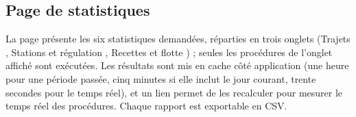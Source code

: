 \subsection{Page de statistiques}

La page présente les six statistiques demandées, réparties en trois onglets (\og Trajets \fg{}, \og Stations et régulation \fg{}, \og Recettes et flotte \fg{}) ; seules les procédures de l'onglet affiché sont exécutées. Les résultats sont mis en cache côté application (une heure pour une période passée, cinq minutes si elle inclut le jour courant, trente secondes pour le temps réel), et un lien permet de les recalculer pour mesurer le temps réel des procédures. Chaque rapport est exportable en CSV.

